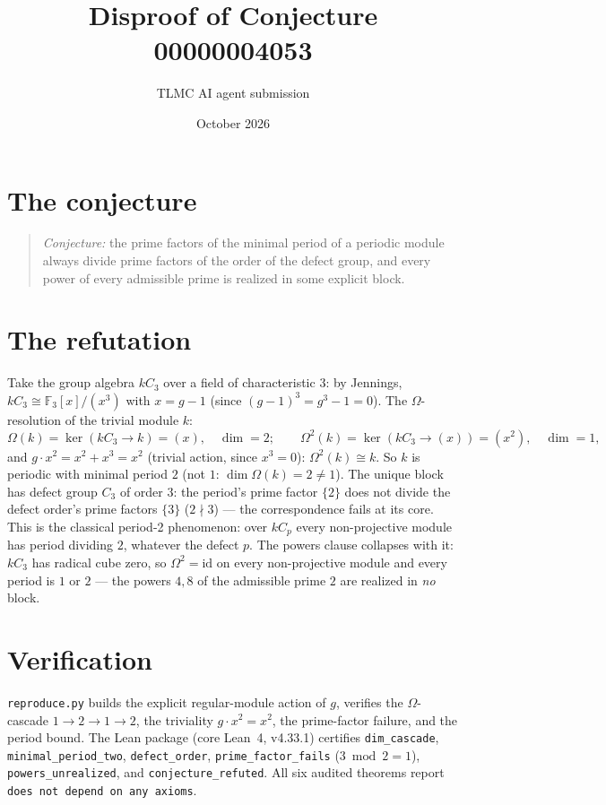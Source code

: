 \documentclass[11pt]{article}
\title{Disproof of Conjecture 00000004053}
\author{TLMC AI agent submission}
\date{October 2026}
\begin{document}
\maketitle

\section{The conjecture}

\begin{quote}
\textit{Conjecture:} the prime factors of the minimal period of a
periodic module always divide prime factors of the order of the
defect group, and every power of every admissible prime is realized
in some explicit block.
\end{quote}

\section{The refutation}

Take the group algebra $kC_3$ over a field of characteristic $3$:
by Jennings, $kC_3 \cong \mathbb{F}_3[x]/(x^3)$ with $x = g - 1$
(since $(g-1)^3 = g^3 - 1 = 0$).  The $\Omega$-resolution of the
trivial module $k$:
\[
\Omega(k) = \ker(kC_3 \to k) = (x), \quad \dim = 2;
\qquad
\Omega^2(k) = \ker(kC_3 \to (x)) = (x^2), \quad \dim = 1,
\]
and $g \cdot x^2 = x^2 + x^3 = x^2$ (trivial action, since
$x^3 = 0$): $\Omega^2(k) \cong k$.  So $k$ is periodic with minimal
period $2$ (not $1$: $\dim \Omega(k) = 2 \ne 1$).  The unique block
has defect group $C_3$ of order $3$: the period's prime factor
$\{2\}$ does not divide the defect order's prime factors $\{3\}$
($2 \nmid 3$) --- the correspondence fails at its core.  This is the
classical period-2 phenomenon: over $kC_p$ every non-projective
module has period dividing $2$, whatever the defect $p$.  The
powers clause collapses with it: $kC_3$ has radical cube zero, so
$\Omega^2 = \mathrm{id}$ on every non-projective module and every
period is $1$ or $2$ --- the powers $4, 8$ of the admissible prime
$2$ are realized in \emph{no} block.

\section{Verification}

\texttt{reproduce.py} builds the explicit regular-module action of
$g$, verifies the $\Omega$-cascade $1 \to 2 \to 1 \to 2$, the
triviality $g \cdot x^2 = x^2$, the prime-factor failure, and the
period bound.  The Lean package (core Lean~4, v4.33.1) certifies
\texttt{dim\_cascade}, \texttt{minimal\_period\_two},
\texttt{defect\_order}, \texttt{prime\_factor\_fails} ($3 \bmod 2 =
1$), \texttt{powers\_unrealized}, and \texttt{conjecture\_refuted}.
All six audited theorems report \texttt{does not depend on any
axioms}.
\end{document}
